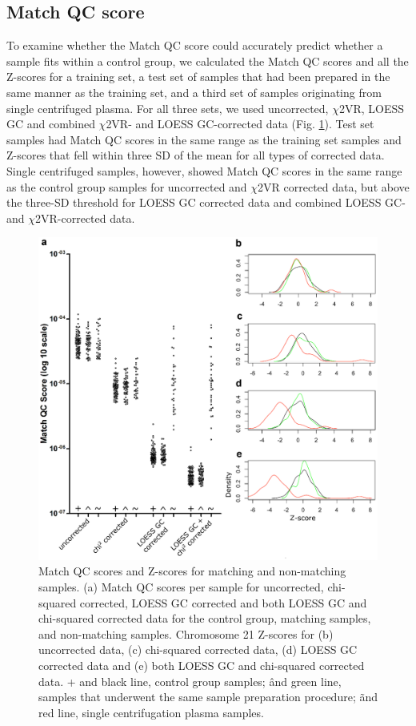 \subsection{Match QC score}
To examine whether the Match QC score could accurately predict whether a sample fits within a control group, we calculated the Match QC scores and all the Z-scores for a training set, a test set of samples that had been prepared in the same manner as the training set, and a third set of samples originating from single centrifuged plasma. 
For all three sets, we used uncorrected, $\chi$2VR, LOESS GC and combined $\chi$2VR- and LOESS GC-corrected data (Fig. \ref{fig:Algorithms_NIPT_Fig7}). 
Test set samples had Match QC scores in the same range as the training set samples and Z-scores that fell within three SD of the mean for all types of corrected data. 
Single centrifuged samples, however, showed Match QC scores in the same range as the control group samples for uncorrected and $\chi$2VR corrected data, but above the three-SD threshold for LOESS GC corrected data and combined LOESS GC- and $\chi$2VR-corrected data.

\begin{figure}
	\includegraphics[width=0.8\linewidth]{img/Algorithms_NIPT_Fig7}
	\caption[Match QC scores and Z-scores]{Match QC scores and Z-scores for matching and non-matching samples. (a) Match QC scores per sample for uncorrected, chi-squared corrected, LOESS GC corrected and both LOESS GC and chi-squared corrected data for the control group, matching samples, and non-matching samples. Chromosome 21 Z-scores for (b) uncorrected data, (c) chi-squared corrected data, (d) LOESS GC corrected data and (e) both LOESS GC and chi-squared corrected data. + and black line, control group samples; \^ and green line, samples that underwent the same sample preparation procedure; \~ and red line, single centrifugation plasma samples.}
	\label{fig:Algorithms_NIPT_Fig7}
\end{figure}

